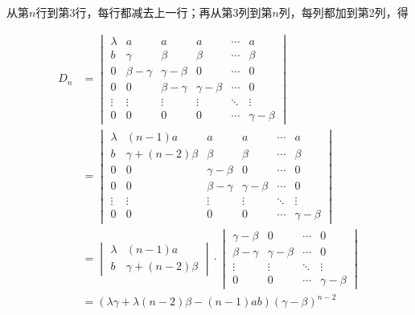 \begin{solution}
    从第$n$行到第3行，每行都减去上一行；再从第3列到第$n$列，每列都加到第2列，得

    \begin{align*}
        D_n & =
        \begin{vmatrix}
            \lambda & a            & a            & a            & \cdots & a            \\
            b       & \gamma       & \beta        & \beta        & \cdots & \beta        \\
            0       & \beta-\gamma & \gamma-\beta & 0            & \cdots & 0            \\
            0       & 0            & \beta-\gamma & \gamma-\beta & \cdots & 0            \\
            \vdots  & \vdots       & \vdots       & \vdots       & \ddots & \vdots       \\
            0       & 0            & 0            & 0            & \cdots & \gamma-\beta
        \end{vmatrix}             \\
            & =\begin{vmatrix}
                   \lambda & (n-1)a            & a            & a            & \cdots & a            \\
                   b       & \gamma+(n-2)\beta & \beta        & \beta        & \cdots & \beta        \\
                   0       & 0                 & \gamma-\beta & 0            & \cdots & 0            \\
                   0       & 0                 & \beta-\gamma & \gamma-\beta & \cdots & 0            \\
                   \vdots  & \vdots            & \vdots       & \vdots       & \ddots & \vdots       \\
                   0       & 0                 & 0            & 0            & \cdots & \gamma-\beta
               \end{vmatrix} \\
            & =\begin{vmatrix}
                   \lambda & (n-1)a            \\
                   b       & \gamma+(n-2)\beta
               \end{vmatrix} \cdot \begin{vmatrix}
                                       \gamma-\beta & 0            & \cdots & 0            \\
                                       \beta-\gamma & \gamma-\beta & \cdots & 0            \\
                                       \vdots       & \vdots       & \ddots & \vdots       \\
                                       0            & 0            & \cdots & \gamma-\beta
                                   \end{vmatrix}           \\
            & =(\lambda \gamma+\lambda(n-2)\beta-(n-1)ab)(\gamma-\beta)^{n-2}
    \end{align*}
\end{solution}

